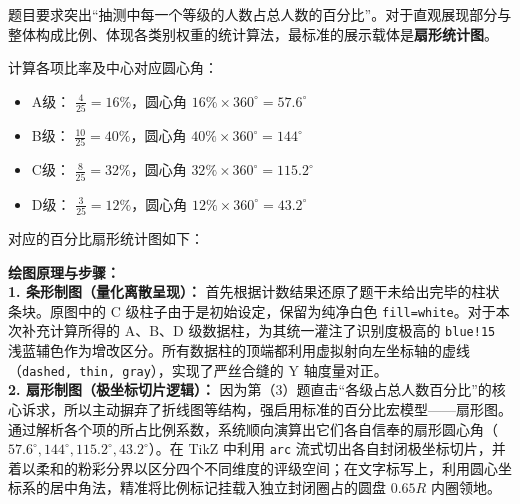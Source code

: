 \documentclass[12pt, a4paper]{ctexrep}
\begin{document}
题目要求突出“抽测中每一个等级的人数占总人数的百分比”。对于直观展现部分与整体构成比例、体现各类别权重的统计算法，最标准的展示载体是\textbf{扇形统计图}。

计算各项比率及中心对应圆心角：
\begin{itemize}
    \item A级： $\frac{4}{25} = 16\%$，圆心角 $16\% \times 360^\circ = 57.6^\circ$
    \item B级： $\frac{10}{25} = 40\%$，圆心角 $40\% \times 360^\circ = 144^\circ$
    \item C级： $\frac{8}{25} = 32\%$，圆心角 $32\% \times 360^\circ = 115.2^\circ$
    \item D级： $\frac{3}{25} = 12\%$，圆心角 $12\% \times 360^\circ = 43.2^\circ$
\end{itemize}

对应的百分比扇形统计图如下：
\begin{center}
\end{center}

\vspace{0.4cm}
{\small\color{blue!70!black}
\textbf{绘图原理与步骤：}\\
\textbf{1. 条形制图（量化离散呈现）：} 首先根据计数结果还原了题干未给出完毕的柱状条块。原图中的 C 级柱子由于是初始设定，保留为纯净白色 \texttt{fill=white}。对于本次补充计算所得的 A、B、D 级数据柱，为其统一灌注了识别度极高的 \texttt{blue!15} 浅蓝辅色作为增改区分。所有数据柱的顶端都利用虚拟射向左坐标轴的虚线（\texttt{dashed, thin, gray}），实现了严丝合缝的 Y 轴度量对正。\\
\textbf{2. 扇形制图（极坐标切片逻辑）：} 因为第（3）题直击“各级占总人数百分比”的核心诉求，所以主动摒弃了折线图等结构，强启用标准的百分比宏模型——扇形图。通过解析各个项的所占比例系数，系统顺向演算出它们各自信奉的扇形圆心角（$57.6^\circ, 144^\circ, 115.2^\circ, 43.2^\circ$）。在 TikZ 中利用 \texttt{arc} 流式切出各自封闭极坐标切片，并着以柔和的粉彩分界以区分四个不同维度的评级空间；在文字标写上，利用圆心坐标系的居中角法，精准将比例标记挂载入独立封闭圈占的圆盘 $0.65R$ 内圈领地。
}
\end{document}
